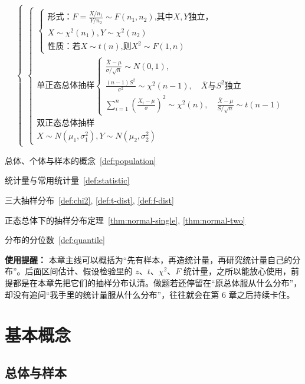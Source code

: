 ﻿\documentclass[lang=cn,11pt]{elegantbook}
\begin{document}
{\[\begin{cases}
\begin{cases}
\begin{cases}
\text{形式：}F=\displaystyle\frac{X/n_1}{Y/n_2}\sim F(n_1,n_2)\text{,其中}X,Y\text{独立，} \\[6pt]
X\sim\chi^2(n_1),Y\sim\chi^2(n_2) \\[6pt]
\text{性质：若}X\sim t(n)\text{,则}X^2\sim F(1,n)
\end{cases} \\[6pt]
\text{单正态总体抽样}
\begin{cases}
\displaystyle\frac{\bar{X}-\mu}{\sigma/\sqrt{n}}\sim N(0,1),\\
\frac{(n-1)S^2}{\sigma^2}\sim\chi^2(n-1),\quad
\bar{X}\text{与}S^2\text{独立}\\
\displaystyle\sum_{i=1}^n\left(\frac{X_i-\mu}{\sigma}\right)^2\sim\chi^2(n),\quad
\frac{\bar{X}-\mu}{S/\sqrt{n}}\sim t(n-1)
\end{cases} \\[6pt]
\text{双正态总体抽样}\\
X\sim N(\mu_1,\sigma_1^2),Y\sim N(\mu_2,\sigma_2^2)
\end{cases}
\end{cases}
\]
}

\begin{introduction}
    \item 总体、个体与样本的概念~\ref{def:population}
    \item 统计量与常用统计量~\ref{def:statistic}
    \item 三大抽样分布~\ref{def:chi2}, \ref{def:t-dist}, \ref{def:f-dist}
    \item 正态总体下的抽样分布定理~\ref{thm:normal-single}, \ref{thm:normal-two}
    \item 分布的分位数~\ref{def:quantile}
\end{introduction}

\begin{note}
\textbf{使用提醒：} 本章主线可以概括为“先有样本，再造统计量，再研究统计量自己的分布”。后面区间估计、假设检验里的 \(z\)、\(t\)、\(\chi^2\)、\(F\) 统计量，之所以能放心使用，前提都是在本章先把它们的抽样分布认清。做题若还停留在“原总体服从什么分布”，却没有追问“我手里的统计量服从什么分布”，往往就会在第 6 章之后持续卡住。
\end{note}

\section{基本概念}

\subsection{总体与样本}
\end{document}
